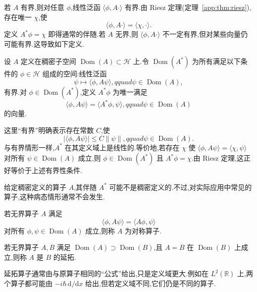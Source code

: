 若 \(A\) 有界,则对任意 \(\phi\),线性泛函 \(\langle\phi,A\mathord{\cdot}\rangle\) 有界.由 Riesz 定理(定理~\ref{app:thm:riesz}),存在唯一 \(\chi\),使
\[
\langle\phi,A\mathord{\cdot}\rangle=\langle\chi,\mathord{\cdot}\rangle.
\]
定义 \(A^{*}\phi=\chi\) 即得通常的伴随.若 \(A\) 无界,则 \(\langle\phi,A\mathord{\cdot}\rangle\) 不一定有界,但对某些向量仍可能有界.这导致如下定义.

\begin{definition}[无界算子的伴随]\label{def:unbounded-adjoint-ch09}
设 \(A\) 定义在稠密子空间 \(\operatorname{Dom}(A)\subset\mathcal{H}\) 上.令 \(\operatorname{Dom}(A^{*})\) 为所有满足以下条件的 \(\phi\in\mathcal{H}\) 组成的空间:线性泛函
\[
\psi\longmapsto\langle\phi,A\psi\rangle,qquad \psi\in\operatorname{Dom}(A),
\]
有界.对 \(\phi\in\operatorname{Dom}(A^{*})\),定义 \(A^{*}\phi\) 为唯一满足
\[
\langle\phi,A\psi\rangle=\langle A^{*}\phi,\psi\rangle,qquad \psi\in\operatorname{Dom}(A)
\label{eq:unbounded-adjoint-def}
\]
的向量.
\end{definition}

这里“有界”明确表示存在常数 \(C\),使
\[
|\langle\phi,A\psi\rangle|\leq C\|\psi\|,qquad \psi\in\operatorname{Dom}(A).
\]
与有界情形一样,\(A^{*}\) 在其定义域上是线性的.等价地,若存在 \(\chi\) 使 \(\langle\phi,A\psi\rangle=\langle\chi,\psi\rangle\) 对所有 \(\psi\in\operatorname{Dom}(A)\) 成立,则 \(\phi\in\operatorname{Dom}(A^{*})\) 且 \(A^{*}\phi=\chi\).由 Riesz 定理,这正好等价于上述有界性条件.

给定稠密定义的算子 \(A\),其伴随 \(A^{*}\) 可能不是稠密定义的.不过,对实际应用中常见的算子,这种病态情形通常不会发生.

\begin{definition}[对称算子]\label{def:symmetric-unbounded}
若无界算子 \(A\) 满足
\[
\langle\phi,A\psi\rangle=\langle A\phi,\psi\rangle
\label{eq:symmetric-unbounded}
\]
对所有 \(\phi,\psi\in\operatorname{Dom}(A)\) 成立,则称 \(A\) 为对称算子.
\end{definition}

\begin{definition}[算子的延拓]\label{def:operator-extension}
若无界算子 \(A,B\) 满足 \(\operatorname{Dom}(A)\supset\operatorname{Dom}(B)\),且 \(A=B\) 在 \(\operatorname{Dom}(B)\) 上成立,则称 \(A\) 是 \(B\) 的延拓.
\end{definition}

延拓算子通常由与原算子相同的“公式”给出,只是定义域更大.例如在 \(L^{2}(\mathbb{R})\) 上,两个算子都可能由 \(-i\hbar\,\mathrm{d}/\mathrm{d}x\) 给出,但若定义域不同,它们仍是不同的算子.

